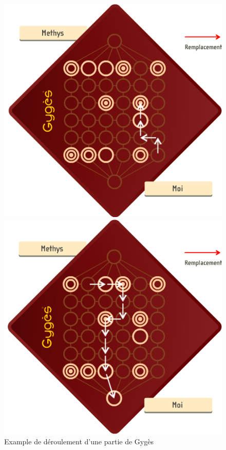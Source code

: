 \documentclass[a4paper]{article}
\begin{document}
\begin{figure}[ht]
\begin{minipage}[b]{0.4\linewidth}
			\end{minipage}

			\begin{minipage}[b]{0.4\linewidth}
			\centering
			\includegraphics[width=\textwidth]{ex3.png}
			\end{minipage}
			\hspace{0.5cm}
			\begin{minipage}[b]{0.4\linewidth}
			\centering
			\includegraphics[width=\textwidth]{ex4.png}
			\end{minipage}
			\caption{Example de déroulement d'une partie de Gygès}
		\end{figure}
\end{document}
